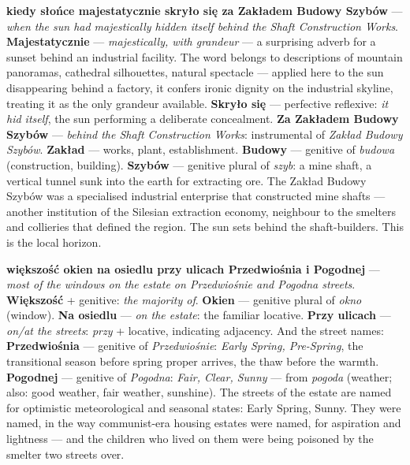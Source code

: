 \textbf{kiedy słońce majestatycznie skryło się za
Zakładem Budowy Szybów} --- \textit{when the sun had
majestically hidden itself behind the Shaft Construction
Works}. \textbf{Majestatycznie} --- \textit{majestically,
with grandeur} --- a surprising adverb for a sunset
behind an industrial facility. The word belongs to
descriptions of mountain panoramas, cathedral silhouettes,
natural spectacle --- applied here to the sun disappearing
behind a factory, it confers ironic dignity on the
industrial skyline, treating it as the only grandeur
available. \textbf{Skryło się} --- perfective reflexive:
\textit{it hid itself}, the sun performing a deliberate
concealment. \textbf{Za Zakładem Budowy Szybów} ---
\textit{behind the Shaft Construction Works}: instrumental
of \textit{Zakład Budowy Szybów}. \textbf{Zakład} ---
works, plant, establishment. \textbf{Budowy} --- genitive
of \textit{budowa} (construction, building). \textbf{Szybów}
--- genitive plural of \textit{szyb}: a mine shaft, a
vertical tunnel sunk into the earth for extracting ore.
The Zakład Budowy Szybów was a specialised industrial
enterprise that constructed mine shafts --- another
institution of the Silesian extraction economy, neighbour
to the smelters and collieries that defined the region.
The sun sets behind the shaft-builders. This is the
local horizon.

\textbf{większość okien na osiedlu przy ulicach
Przedwiośnia i Pogodnej} --- \textit{most of the windows
on the estate on Przedwiośnie and Pogodna streets}.
\textbf{Większość} + genitive: \textit{the majority of}.
\textbf{Okien} --- genitive plural of \textit{okno}
(window). \textbf{Na osiedlu} --- \textit{on the estate}:
the familiar locative. \textbf{Przy ulicach} ---
\textit{on/at the streets}: \textit{przy} + locative,
indicating adjacency. And the street names:
\textbf{Przedwiośnia} --- genitive of \textit{Przedwiośnie}:
\textit{Early Spring, Pre-Spring}, the transitional
season before spring proper arrives, the thaw before
the warmth. \textbf{Pogodnej} --- genitive of
\textit{Pogodna}: \textit{Fair, Clear, Sunny} ---
from \textit{pogoda} (weather; also: good weather,
fair weather, sunshine). The streets of the estate
are named for optimistic meteorological and seasonal
states: Early Spring, Sunny. They were named, in the
way communist-era housing estates were named, for
aspiration and lightness --- and the children who
lived on them were being poisoned by the smelter
two streets over.


